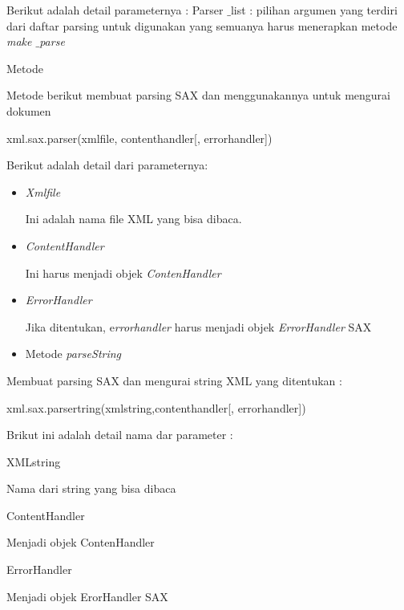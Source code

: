 \begin{itemize}
Berikut adalah detail parameternya : 
Parser $  \_  $list : pilihan argumen yang terdiri dari daftar parsing untuk digunakan yang semuanya harus menerapkan metode \textit{make $  \_  $parse}
\end{itemize}

\noindent 
Metode\par
Metode berikut membuat parsing SAX dan menggunakannya untuk mengurai dokumen \par
\vspace{10pt}
{\fontsize{10pt}{10pt}\selectfont xml.sax.parser(xmlfile, contenthandler[, errorhandler])} \par
\vspace{10pt}
Berikut adalah detail dari parameternya: \par
\noindent 
\begin{itemize}
\item \textit{Xmlfile } \par
Ini adalah nama file XML yang bisa dibaca. \par
\noindent 
\item \textit{ContentHandler } \par
Ini harus menjadi objek \textit{ContenHandler} \par
\noindent 
\item \textit{ErrorHandler} \par
Jika ditentukan, e\textit{rrorhandler} harus menjadi objek \textit{ErrorHandler} SAX \par
\noindent 
\item Metode\textit{ parseString}\end{itemize}
 \par
Membuat parsing SAX dan mengurai string XML yang ditentukan : \par
\vspace{12pt}
{\fontsize{10pt}{10pt}\selectfont xml.sax.parsertring(xmlstring,contenthandler[, errorhandler])} \par
\vspace{12pt}
Brikut ini adalah detail nama dar parameter : \par
\noindent 
{XMLstring} \par
Nama dari string yang bisa dibaca \par
\noindent 
{ContentHandler} \par
Menjadi objek ContenHandler \par
\noindent 
{ErrorHandler} \par
Menjadi objek ErorHandler SAX \par
